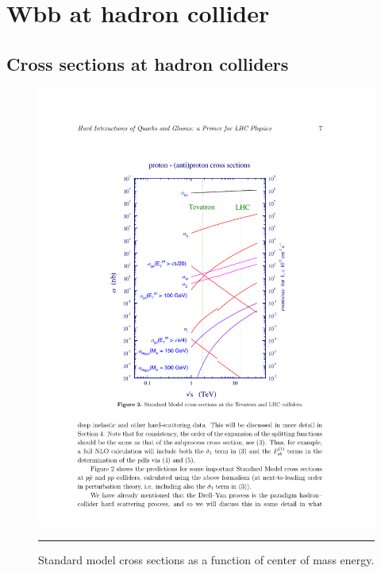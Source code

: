 
\section{Wbb at hadron collider}


\subsection{Cross sections at hadron colliders}

\begin{figure}[htbp]
	\centering
		\includegraphics{Figures/pp_xsec.pdf}
		\rule{35em}{0.5pt}
	\caption[Proton-proton cross sections]{Standard model cross sections as a function of center of mass energy.\citep{Campbell:2006wx} }
	\label{fig:pp_xsec}
\end{figure}

